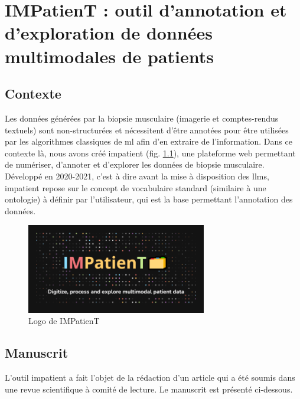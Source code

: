 \chapter{IMPatienT : outil d’annotation et d’exploration de données multimodales de patients}

\section{Contexte}
Les données générées par la biopsie musculaire (imagerie et comptes-rendus textuels) sont non-structurées et nécessitent d'être annotées pour être utilisées par les algorithmes classiques de \gls{ml} afin d'en extraire de l'information. Dans ce contexte là, nous avons créé \gls{impatient} (fig. \ref{fig:impatient_logo}), une plateforme web permettant de numériser, d'annoter et d'explorer les données de biopsie musculaire. Développé en 2020-2021, c'est à dire avant la mise à disposition des \gls{llms}, \gls{impatient} repose sur le concept de vocabulaire standard (similaire à une ontologie) à définir par l'utilisateur, qui est la base permettant l'annotation des données.

\begin{figure}[htbp]
  \centering
  \includegraphics[width=0.7\textwidth]{figures/impatient_banner.png}
  \caption[Logo IMPatienT]{Logo de IMPatienT}
  \label{fig:impatient_logo}
\end{figure}


\section{Manuscrit} 
L'outil \gls{impatient} a fait l'objet de la rédaction d'un article qui a été soumis dans une revue scientifique à comité de lecture. Le manuscrit est présenté ci-dessous.


